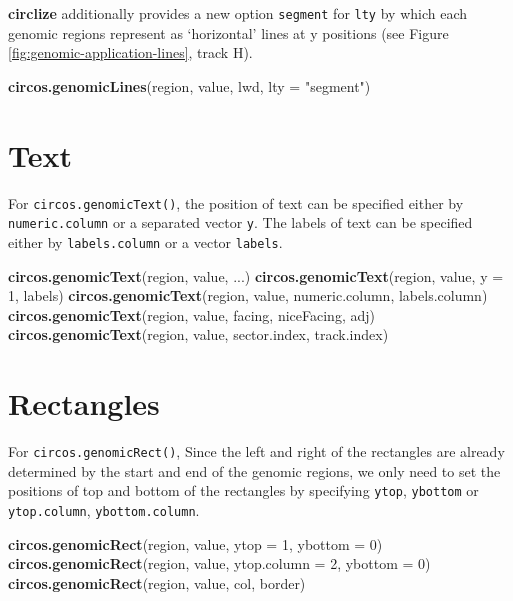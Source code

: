 \documentclass[]{book}
\newenvironment{Shaded}{\begin{snugshade}}{\end{snugshade}}
\newcommand{\KeywordTok}[1]{\textcolor[rgb]{0.13,0.29,0.53}{\textbf{#1}}}
\newcommand{\DataTypeTok}[1]{\textcolor[rgb]{0.13,0.29,0.53}{#1}}
\newcommand{\DecValTok}[1]{\textcolor[rgb]{0.00,0.00,0.81}{#1}}
\newcommand{\StringTok}[1]{\textcolor[rgb]{0.31,0.60,0.02}{#1}}
\newcommand{\NormalTok}[1]{#1}
\begin{document}
\textbf{circlize} additionally provides a new option \texttt{segment}
for \texttt{lty} by which each genomic regions represent as `horizontal'
lines at y positions (see Figure \ref{fig:genomic-application-lines},
track H).

\begin{Shaded}
\begin{Highlighting}[]
\KeywordTok{circos.genomicLines}\NormalTok{(region, value, lwd, }\DataTypeTok{lty =} \StringTok{"segment"}\NormalTok{)}
\end{Highlighting}
\end{Shaded}

\section{Text}\label{genomic-text}

For \texttt{circos.genomicText()}, the position of text can be specified
either by \texttt{numeric.column} or a separated vector \texttt{y}. The
labels of text can be specified either by \texttt{labels.column} or a
vector \texttt{labels}.

\begin{Shaded}
\begin{Highlighting}[]
\KeywordTok{circos.genomicText}\NormalTok{(region, value, ...)}
\KeywordTok{circos.genomicText}\NormalTok{(region, value, }\DataTypeTok{y =} \DecValTok{1}\NormalTok{, labels)}
\KeywordTok{circos.genomicText}\NormalTok{(region, value, numeric.column, labels.column)}
\KeywordTok{circos.genomicText}\NormalTok{(region, value, facing, niceFacing, adj)}
\KeywordTok{circos.genomicText}\NormalTok{(region, value, sector.index, track.index)}
\end{Highlighting}
\end{Shaded}

\section{Rectangles}\label{genomic-rectangles}

For \texttt{circos.genomicRect()}, Since the left and right of the
rectangles are already determined by the start and end of the genomic
regions, we only need to set the positions of top and bottom of the
rectangles by specifying \texttt{ytop}, \texttt{ybottom} or
\texttt{ytop.column}, \texttt{ybottom.column}.

\begin{Shaded}
\begin{Highlighting}[]
\KeywordTok{circos.genomicRect}\NormalTok{(region, value, }\DataTypeTok{ytop =} \DecValTok{1}\NormalTok{, }\DataTypeTok{ybottom =} \DecValTok{0}\NormalTok{)}
\KeywordTok{circos.genomicRect}\NormalTok{(region, value, }\DataTypeTok{ytop.column =} \DecValTok{2}\NormalTok{, }\DataTypeTok{ybottom =} \DecValTok{0}\NormalTok{)}
\KeywordTok{circos.genomicRect}\NormalTok{(region, value, col, border)}
\end{Highlighting}
\end{Shaded}
\end{document}
